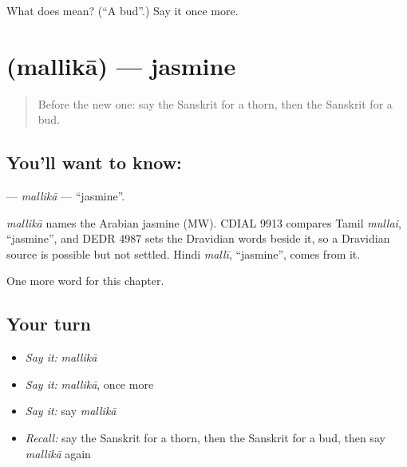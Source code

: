 \begin{tcolorbox}[breakable,colback=teal!4,colframe=teal!35!black,title={Before you move on}]
What does  mean? (\textquotedblleft{}A bud\textquotedblright{}.) Say it once more.
\end{tcolorbox}
\section[\texorpdfstring{\sk{मल्लिका} (mallikā)}{मल्लिका (mallikā)}]{ (mallikā) — jasmine}

\label{lesson:SA-C252-mallika}



\begin{quote}
Before the new one: say the Sanskrit for a thorn, then the Sanskrit for a bud.
\end{quote}

\subsection*{You'll want to know: }
\textbf{} — \emph{mallikā} — \textquotedblleft{}jasmine\textquotedblright{}.

\begin{cousinweb}
\emph{mallikā} names the Arabian jasmine (MW). CDIAL 9913 compares Tamil \emph{mullai}, \textquotedblleft{}jasmine\textquotedblright{}, and DEDR 4987 sets the Dravidian words beside it, so a Dravidian source is possible but not settled. Hindi \emph{mallī}, \textquotedblleft{}jasmine\textquotedblright{}, comes from it.
\end{cousinweb}

\begin{grammarlens}[title={What you've built}]
One more word for this chapter.
\end{grammarlens}

\subsection*{Your turn}
\begin{itemize}
\raggedright
  \item \emph{Say it:} \emph{mallikā}
  \item \emph{Say it:} \emph{mallikā}, once more
  \item \emph{Say it:} say \emph{mallikā}
  \item \emph{Recall:} say the Sanskrit for a thorn, then the Sanskrit for a bud, then say \emph{mallikā} again
\end{itemize}

